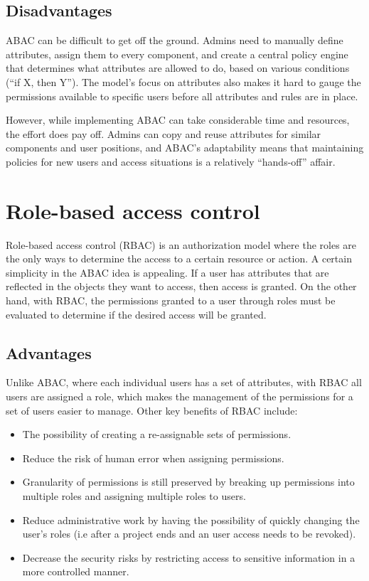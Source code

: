\subsection*{Disadvantages}
ABAC can be difficult to get off the ground. Admins need to manually define attributes, assign them to every component, and create a central policy engine that determines what attributes are allowed to do, based on various conditions (“if X, then Y”). The model's focus on attributes also makes it hard to gauge the permissions available to specific users before all attributes and rules are in place.\cite{keithABAC}

However, while implementing ABAC can take considerable time and resources, the effort does pay off. Admins can copy and reuse attributes for similar components and user positions, and ABAC's adaptability means that maintaining policies for new users and access situations is a relatively “hands-off” affair.

\section{Role-based access control}

Role-based access control (RBAC) is an authorization model where the roles are the only ways to determine the access to a certain resource or action. A certain simplicity in the ABAC idea is appealing. If a user has attributes that are reflected in the objects they want to access, then access is granted. On the other hand, with RBAC, the permissions granted to a user through roles must be evaluated to determine if the desired access will be granted.\cite{coyneABAC}

\subsection*{Advantages}
Unlike ABAC, where each individual users has a set of attributes, with RBAC all users are assigned a role, which makes the management of the permissions for a set of users easier to manage. Other key benefits of RBAC include:

\begin{itemize}
	\item The possibility of creating a re-assignable sets of permissions.
 	\item Reduce the risk of human error when assigning permissions. 
  	\item Granularity of permissions is still preserved by breaking up permissions into multiple roles and assigning multiple roles to users.
	\item Reduce administrative work by having the possibility of quickly changing the user's roles (i.e after a project ends and an user access needs to be revoked).
 	\item Decrease the security risks by restricting access to sensitive information in a more controlled manner.
\end{itemize}


